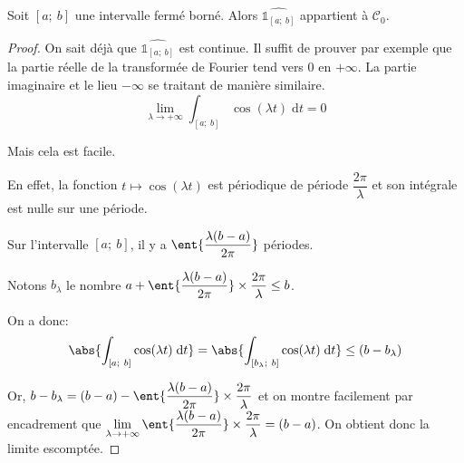 \begin{lem}
Soit $[a;~b]$ une intervalle fermé borné. Alors $\widehat{\mathbb{1}_{[a;~b]}}$ appartient à $\mathcal{C}_0$.
\end{lem}

\begin{proof}
On sait déjà que $\widehat{\mathbb{1}_{[a;~b]}}$ est continue. Il suffit de prouver par exemple que la partie réelle de la transformée de Fourier tend vers $0$ en $+\infty$. La partie imaginaire et le lieu $-\infty$ se traitant de manière similaire.
\[
\lim \limits_{\lambda \to + \infty} \int_{[a;~b]} \cos(\lambda t) \; \mathrm d t = 0
\]


Mais cela est facile. 

En effet, la fonction $t \mapsto \cos(\lambda t)$ est périodique de période $\dfrac{2\pi}{\lambda}$ et son intégrale est nulle sur une période.

Sur l'intervalle $[a;~b]$, il y a $\ent{\dfrac{\lambda(b-a)}{2\pi}}$ périodes. 

Notons $b_\lambda$ le nombre $a + \ent{\dfrac{\lambda(b-a)}{2\pi}} \times \dfrac{2\pi}{\lambda} \leq b$.

On a donc:
\[
\abs{\int_{[a;~b]} \cos(\lambda t) \; \mathrm d t} = \abs{\int_{[b_\lambda;~b]}  \cos(\lambda t) \; \mathrm d t} \leq (b-b_{\lambda}) 
\]

Or, $b - b_{\lambda} = (b-a) - \ent{\dfrac{\lambda(b-a)}{2\pi}} \times \dfrac{2\pi}{\lambda}$ et on montre facilement par encadrement que $\lim \limits_{\lambda \to +\infty} \ent{\dfrac{\lambda(b-a)}{2\pi}} \times \dfrac{2\pi}{\lambda} = (b-a)$. On obtient donc la limite escomptée.
\end{proof}



